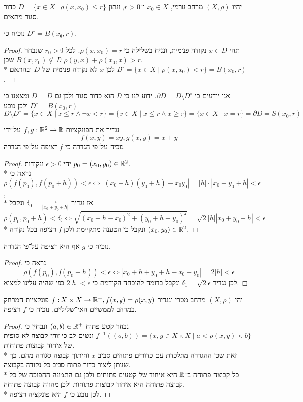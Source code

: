 \Question{}
יהיו $(X, \rho)$ מרחב נורמי, $x_0 \in X$ ו־$r > 0$, ונתון $D = \{ x \in X \mid \rho(x, x_0) \le r \}$ כדור סגור מתאים.

\Subquestion{}
נוכיח כי $D^\circ = B(x_0, r)$.
\begin{proof}
	תהי $x \in D$ נקודה פנימית, ונניח בשלילה כי $\rho(x, x_0) = r$. לכל $r_0 > 0$ שנבחר $B(x, r_0) \not\subseteq D$ שכן $\rho(y, x) + \rho(x_0, x) > r$. \\*
	לכן $x$ לא נקודה פנימית של $D$ ובהתאם $D^\circ = \{ x \in X \mid \rho(x, x_0) < r\} = B(x_0, r)$.
\end{proof}

\Subquestion{}
אנו יודעים כי $\partial D = \overline{D} \setminus D^\circ$. ידוע לנו כי $D$ הוא כדור סגור ולכן גם $D = \overline{D}$ ומצאנו כי $D^\circ = B(x_0, r)$ ולכן נובע
\[
	D \setminus D^\circ = \{ x \in X \mid x \le r \land \lnot x < r \}
	= \{ x \in X \mid x \le r \land x \ge r \}
	= \{ x \in X \mid x = r \}
	= \partial D = S(x_0, r)
\]

\Question{}
נגדיר את הפונקציות $f, g : \mathbb{R}^2 \to \mathbb{R}$ על־ידי
\[
	f(x, y) = xy, g(x, y) = x + y
\]
נוכיח על־פי הגדרה כי $f$ רציפה על־פי הגדרה.
\begin{proof}
	יהי $\epsilon > 0$ ונקודות $p_0 = (x_0, y_0) \in \mathbb{R}^2$. \\*
	נראה כי $\rho(f(p_0), f(p_0 + h)) < \epsilon \iff |(x_0 + h)(y_0 + h) - x_0y_0| = |h| \cdot |x_0 + y_0 + h| < \epsilon$, \\*
	אז נגדיר $\delta_0 = \frac{\epsilon}{|x_0 + y_0 + h|}$ ונקבל $\rho(p_0, p_0 + h) < \delta_0 \iff \sqrt{{(x_0 + h - x_0)}^2 + {(y_0 + h - y_0)}^2} = \sqrt{2} |h||x_0 + y_0 + h| < \epsilon$ \\*
	ונקבל כי הטענה מתקיימת ולכן $f$ רציפה בכל נקודה $(x_0, y_0) \in \mathbb{R}^2$.
\end{proof}
נוכיח כי $g$ אף היא רציפה על־פי הגדרה.
\begin{proof}
	נראה כי
	\[
		\rho(f(p_0), f(p_0 + h)) < \epsilon \iff |x_0 + h + y_0 + h - x_0 - y_0| = 2|h| < \epsilon
	\]
	לכן נגדיר $\delta_1 = \sqrt{2} \epsilon$ ונקבל בדומה להוכחה הקודמת כי $2 |h| < \epsilon$ כפי שהיה עלינו למצוא.
\end{proof}

\Question{}
יהי $(X, \rho)$ מרחב מטרי ונגדיר $f : X \times X \to \mathbb{R}^+, f(x, y) = \rho(x, y)$ פונקציית המרחק במרחב לממשיים האי־שליליים. נוכיח כי $f$ רציפה.
\begin{proof}
	נבחר קטע פתוח $(a, b) \in \mathbb{R}^+$ ונבחין כי $f^{-1}((a, b)) = \{ x, y \in X \times X \mid a < \rho(x, y) < b \}$ ונשים לב כי זוהי קבוצה לא סופית של איחוד קבוצות פתוחות. \\*
	זאת שכן ההגדרה מתלכדת עם כדורים פתוחים סביב $x$ וחיתוך קבוצה סגורה מהם, כך שניתן ליצור כדור פתוח סביב כל נקודה בקבוצה. \\*
	כל קבוצה פתוחה ב־$\mathbb{R}$ היא איחוד של קטעים פתוחים ולכן גם התמונה ההפוכה של כל קבוצה פתוחה היא איחוד קבוצות פתוחות ולכן מהווה קבוצה פתוחה. \\*
	לכן נובע כי $f$ היא פונקציה רציפה.
\end{proof}

